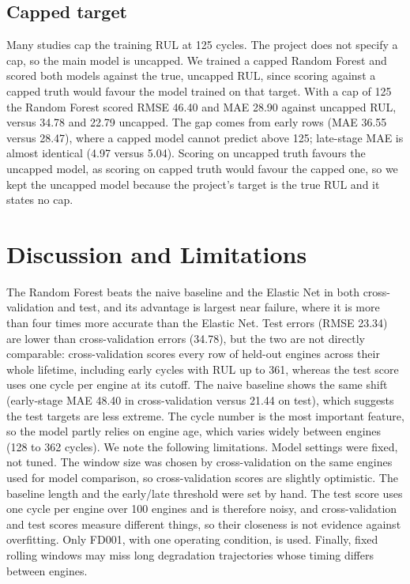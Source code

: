 \documentclass[conference]{IEEEtran}
\begin{document}
\subsection{Capped target}
Many studies cap the training RUL at 125 cycles. The project does not specify a cap, so the main model is uncapped. We trained a capped Random Forest and scored both models against the true, uncapped RUL, since scoring against a capped truth would favour the model trained on that target. With a cap of 125 the Random Forest scored RMSE 46.40 and MAE 28.90 against uncapped RUL, versus 34.78 and 22.79 uncapped. The gap comes from early rows (MAE 36.55 versus 28.47), where a capped model cannot predict above 125; late-stage MAE is almost identical (4.97 versus 5.04). Scoring on uncapped truth favours the uncapped model, as scoring on capped truth would favour the capped one, so we kept the uncapped model because the project's target is the true RUL and it states no cap.

\section{Discussion and Limitations}
The Random Forest beats the naive baseline and the Elastic Net in both cross-validation and test, and its advantage is largest near failure, where it is more than four times more accurate than the Elastic Net. Test errors (RMSE 23.34) are lower than cross-validation errors (34.78), but the two are not directly comparable: cross-validation scores every row of held-out engines across their whole lifetime, including early cycles with RUL up to 361, whereas the test score uses one cycle per engine at its cutoff. The naive baseline shows the same shift (early-stage MAE 48.40 in cross-validation versus 21.44 on test), which suggests the test targets are less extreme. The cycle number is the most important feature, so the model partly relies on engine age, which varies widely between engines (128 to 362 cycles). We note the following limitations. Model settings were fixed, not tuned. The window size was chosen by cross-validation on the same engines used for model comparison, so cross-validation scores are slightly optimistic. The baseline length and the early/late threshold were set by hand. The test score uses one cycle per engine over 100 engines and is therefore noisy, and cross-validation and test scores measure different things, so their closeness is not evidence against overfitting. Only FD001, with one operating condition, is used. Finally, fixed rolling windows may miss long degradation trajectories whose timing differs between engines.
\end{document}
